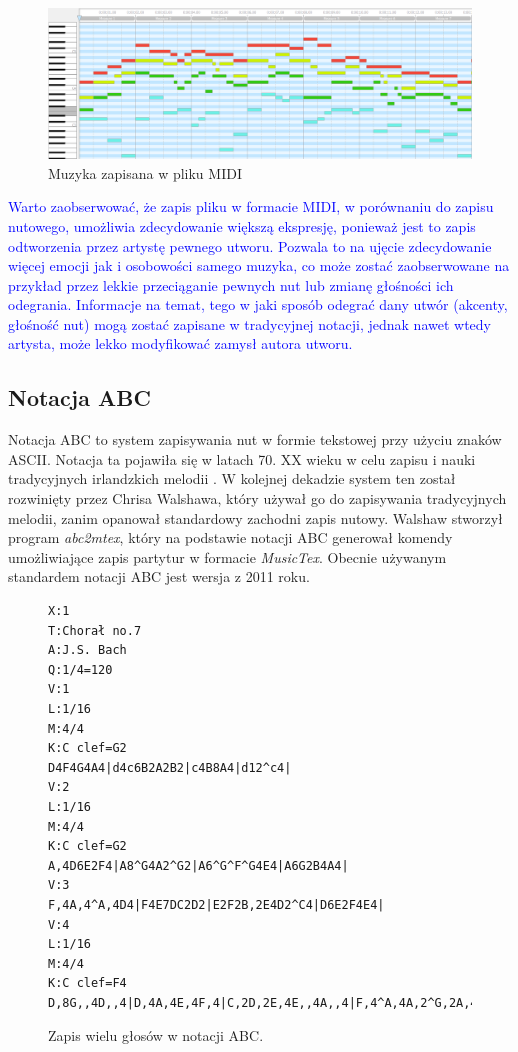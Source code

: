 \documentclass[data-science]{agh-wi} %
\begin{document}
\begin{figure}[ht!]
    \begin{center}
        \includegraphics*[width=\linewidth]{./img/piano_roll.png}
    \end{center}
    \caption{Muzyka zapisana w pliku MIDI}\label{fig:jsb_pianoroll}
\end{figure}

\textcolor{blue}{Warto zaobserwować, że zapis pliku w formacie MIDI, w porównaniu do zapisu nutowego, umożliwia zdecydowanie większą ekspresję, ponieważ jest to zapis odtworzenia przez artystę pewnego utworu. Pozwala to na ujęcie zdecydowanie więcej emocji jak i osobowości samego muzyka, co może zostać zaobserwowane na przykład przez lekkie przeciąganie pewnych nut lub zmianę głośności ich odegrania. Informacje na temat, tego w jaki sposób odegrać dany utwór (akcenty, głośność nut) mogą zostać zapisane w tradycyjnej notacji, jednak nawet wtedy artysta, może lekko modyfikować zamysł autora utworu.}

\subsection{Notacja ABC}
Notacja ABC to system zapisywania nut w formie tekstowej przy użyciu znaków ASCII. Notacja ta pojawiła się w latach 70. XX wieku w celu zapisu i nauki tradycyjnych irlandzkich melodii \cite{abc_history}. W kolejnej dekadzie system ten został rozwinięty przez Chrisa Walshawa, który używał go do zapisywania tradycyjnych melodii, zanim opanował standardowy zachodni zapis nutowy. Walshaw stworzył program \textit{abc2mtex}, który na podstawie notacji ABC generował komendy umożliwiające zapis partytur w formacie \textit{MusicTex}. Obecnie używanym standardem notacji ABC jest wersja z 2011 roku.

\begin{figure}[ht!]
    \begin{verbatim}
X:1
T:Chorał no.7
A:J.S. Bach
Q:1/4=120
V:1
L:1/16
M:4/4
K:C clef=G2
D4F4G4A4|d4c6B2A2B2|c4B8A4|d12^c4|
V:2
L:1/16
M:4/4
K:C clef=G2
A,4D6E2F4|A8^G4A2^G2|A6^G^F^G4E4|A6G2B4A4|
V:3
F,4A,4^A,4D4|F4E7DC2D2|E2F2B,2E4D2^C4|D6E2F4E4|
V:4
L:1/16
M:4/4
K:C clef=F4
D,8G,,4D,,4|D,4A,4E,4F,4|C,2D,2E,4E,,4A,,4|F,4^A,4A,2^G,2A,4|        
\end{verbatim}
    \caption{Zapis wielu głosów w notacji ABC.}\label{fig:abc_polyphony}
\end{figure}
\end{document}
